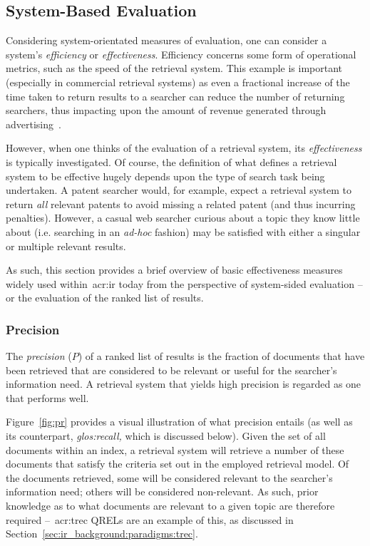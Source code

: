 \subsection{System-Based Evaluation}\label{sec:ir_background:evaluation:system}
Considering system-orientated measures of evaluation, one can consider a system's \emph{efficiency} or \emph{effectiveness}. Efficiency concerns some form of operational metrics, such as the speed of the retrieval system. This example is important (especially in commercial retrieval systems) as even a fractional increase of the time taken to return results to a searcher can reduce the number of returning searchers, thus impacting upon the amount of revenue generated through advertising~\citep{brutlag2009speed}.

However, when one thinks of the evaluation of a retrieval system, its \emph{effectiveness} is typically investigated. Of course, the definition of what defines a retrieval system to be effective hugely depends upon the type of search task being undertaken. A patent searcher would, for example, expect a retrieval system to return \emph{all} relevant patents to avoid missing a related patent (and thus incurring penalties). However, a casual web searcher curious about a topic they know little about (i.e. searching in an \emph{ad-hoc} fashion) may be satisfied with either a singular or multiple relevant results.

As such, this section provides a brief overview of basic effectiveness measures widely used within~\gls{acr:ir} today from the perspective of system-sided evaluation -- or the evaluation of the ranked list of results.

\subsubsection{Precision}\label{sec:ir_background:evaluation:system:precision}
The \emph{precision} ($P$) of a ranked list of results is the fraction of documents that have been retrieved that are considered to be relevant or useful for the searcher's information need. A retrieval system that yields high precision is regarded as one that performs well.

Figure~\ref{fig:pr} provides a visual illustration of what precision entails (as well as its counterpart, \emph{\gls{glos:recall},} which is discussed below). Given the set of all documents within an index, a retrieval system will retrieve a number of these documents that satisfy the criteria set out in the employed retrieval model. Of the documents retrieved, some will be considered relevant to the searcher's information need; others will be considered non-relevant. As such, prior knowledge as to what documents are relevant to a given topic are therefore required --~\gls{acr:trec} QRELs are an example of this, as discussed in Section~\ref{sec:ir_background:paradigms:trec}.

